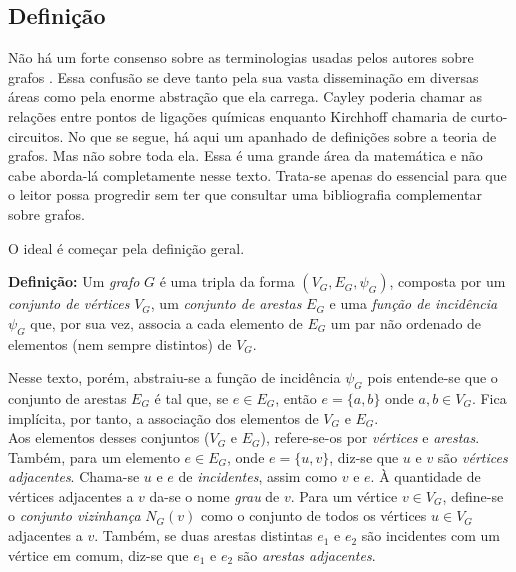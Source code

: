 \documentclass[a4paper,12pt]{article}
\begin{document}
\subsection{Definição}

Não há um forte consenso sobre as terminologias usadas pelos autores sobre grafos \cite{graphTheoryFHarary}. Essa confusão se deve tanto pela sua vasta disseminação em diversas áreas como pela enorme abstração que ela carrega. Cayley poderia chamar as relações entre pontos de ligações químicas enquanto Kirchhoff chamaria de curto-circuitos.
No que se segue, há aqui um apanhado de definições sobre a teoria de grafos. Mas não sobre toda ela. Essa é uma grande área da matemática e não cabe aborda-lá completamente nesse texto. Trata-se apenas do essencial para que o leitor possa progredir sem ter que consultar uma bibliografia complementar sobre grafos.

O ideal é começar pela definição geral.

\begin{center}
	\begin{minipage}{0.9 \linewidth}
		\textbf{Definição:} Um \textit{grafo} $G$ é uma tripla da forma $(V_G,E_G, \psi_{G})$, composta por um \textit{conjunto de vértices} $V_G$, um \textit{conjunto de arestas} $E_G$ e uma \textit{função de incidência} $\psi_{G}$ que, por sua vez, associa a cada elemento de $E_G$ um par não ordenado de elementos (nem sempre distintos) de $V_G$.
	\end{minipage}
\end{center} 

Nesse texto, porém, abstraiu-se a função de incidência $\psi_G$ pois entende-se que o conjunto de arestas $E_G$ é tal que, se $e \in E_G$, então $e = \{a, b\}$ onde $a, b \in V_G$. Fica implícita, por tanto, a associação dos elementos de  $V_G$ e $E_G$.
\\

Aos elementos desses conjuntos ($V_G$ e $E_G$), refere-se-os por \textit{vértices} e \textit{arestas}. Também, para um elemento $e \in E_G$, onde $e = \{u, v\}$, diz-se que $u$ e $v$ são \textit{vértices adjacentes}. Chama-se $u$ e $e$ de \textit{incidentes}, assim como $v$ e $e$. À quantidade de vértices adjacentes a $v$ da-se o nome \textit{grau} de $v$. Para um vértice $v\in V_G$, define-se o \textit{conjunto vizinhança} $N_G(v)$ como o conjunto de todos os vértices $u\in V_G$ adjacentes a $v$. Também, se duas arestas distintas $e_1$ e $e_2$ são incidentes com um vértice em comum, diz-se que $e_1$ e $e_2$ são \textit{arestas adjacentes}. 
\end{document}
